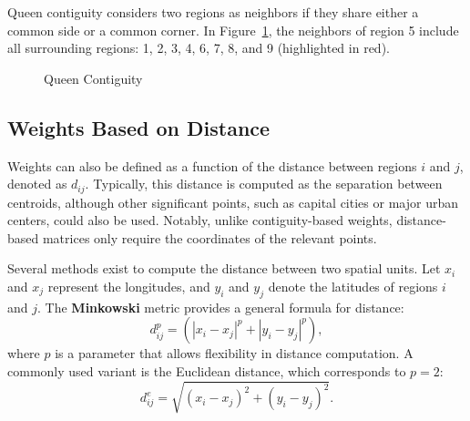 Queen contiguity considers two regions as neighbors if they share either a common side or a common corner. In Figure~\ref{fig:Queen_cont_grid}, the neighbors of region 5 include all surrounding regions: 1, 2, 3, 4, 6, 7, 8, and 9 (highlighted in red).

\begin{figure}[h]
\caption{Queen Contiguity}
\label{fig:Queen_cont_grid}
\centering
{}
\end{figure}


\subsection{Weights Based on Distance}

Weights can also be defined as a function of the distance between regions $i$ and $j$, denoted as $d_{ij}$. Typically, this distance is computed as the separation between centroids, although other significant points, such as capital cities or major urban centers, could also be used. Notably, unlike contiguity-based weights, distance-based matrices only require the coordinates of the relevant points.

Several methods exist to compute the distance between two spatial units. Let $x_i$ and $x_j$ represent the longitudes, and $y_i$ and $y_j$ denote the latitudes of regions $i$ and $j$. The \textbf{Minkowski} metric provides a general formula for distance:
\begin{equation*}
  d_{ij}^p = \left(\left|x_i - x_j\right|^p + \left|y_i - y_j\right|^p\right),
\end{equation*}
%
where $p$ is a parameter that allows flexibility in distance computation. A commonly used variant is the Euclidean distance, which corresponds to $p = 2$:
\begin{equation*}
  d_{ij}^e = \sqrt{(x_i - x_j)^2 + (y_i - y_j)^2}.
\end{equation*}


